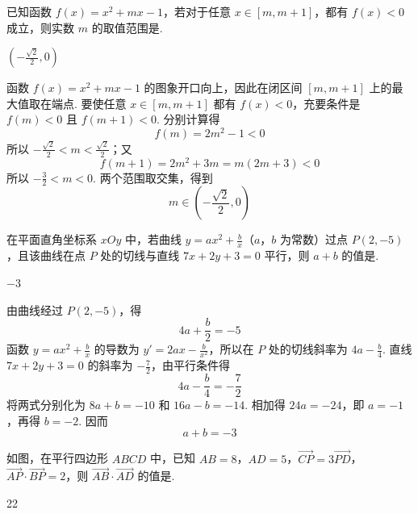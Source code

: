 \begin{problem}
已知函数 \( f(x) = x^2 + mx - 1 \)，若对于任意 \( x \in [m, m + 1] \)，都有 \( f(x) < 0 \) 成立，则实数 \( m \) 的取值范围是\fillinblank{}.
\end{problem}

\begin{answer}
\(\left(-\frac{\sqrt{2}}{2},0\right)\)
\end{answer}

\begin{solution}
函数 \(f(x)=x^2+mx-1\) 的图象开口向上，因此在闭区间 \([m,m+1]\) 上的最大值取在端点. 要使任意 \(x\in[m,m+1]\) 都有 \(f(x)<0\)，充要条件是 \(f(m)<0\) 且 \(f(m+1)<0\).
分别计算得
\[
f(m)=2m^2-1<0
\]
所以 \(-\frac{\sqrt2}{2}<m<\frac{\sqrt2}{2}\)；又
\[
f(m+1)=2m^2+3m=m(2m+3)<0
\]
所以 \(-\frac32<m<0\). 两个范围取交集，得到
\[
m\in\left(-\frac{\sqrt2}{2},0\right)
\]
\end{solution}

\begin{problem}
在平面直角坐标系 \(xOy\) 中，若曲线 \(y = ax^2 + \frac{b}{x}\)（\(a\)，\(b\) 为常数）过点 \(P(2, -5)\)，且该曲线在点 \(P\) 处的切线与直线 \(7x + 2y + 3 = 0\) 平行，则 \(a + b\) 的值是\fillinblank{}.
\end{problem}

\begin{answer}
\(-3\)
\end{answer}

\begin{solution}
由曲线经过 \(P(2,-5)\)，得
\[
4a+\frac b2=-5
\]
函数 \(y=ax^2+\frac bx\) 的导数为 \(y'=2ax-\frac b{x^2}\)，所以在 \(P\) 处的切线斜率为 \(4a-\frac b4\). 直线 \(7x+2y+3=0\) 的斜率为 \(-\frac72\)，由平行条件得
\[
4a-\frac b4=-\frac72
\]
将两式分别化为 \(8a+b=-10\) 和 \(16a-b=-14\).
相加得 \(24a=-24\)，即 \(a=-1\)，再得 \(b=-2\). 因而
\[
a+b=-3
\]
\end{solution}

\begin{problem}
如图，在平行四边形 \(ABCD\) 中，已知 \(AB = 8\)，\(AD = 5\)，\(\overrightarrow{CP} = 3\overrightarrow{PD}\)，\(\overrightarrow{AP} \cdot \overrightarrow{BP} = 2\)，则 \(\overrightarrow{AB} \cdot \overrightarrow{AD}\) 的值是\fillinblank{}.

\end{problem}

\begin{answer}
22
\end{answer}

